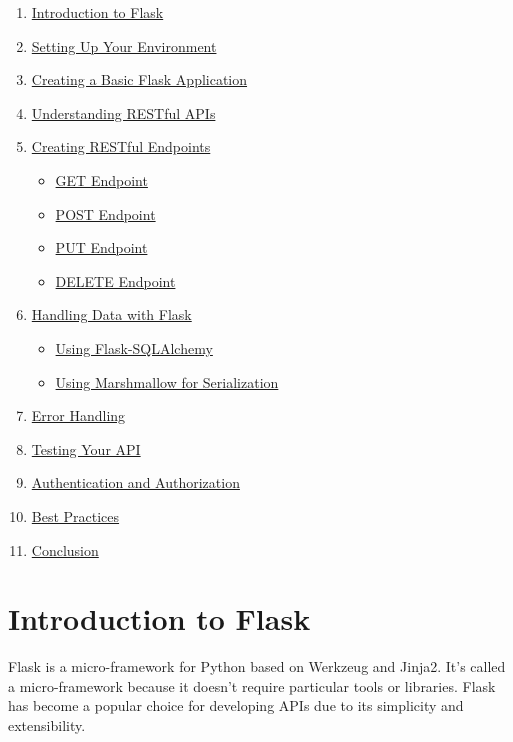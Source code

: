 \documentclass[
  letterpaper,
  DIV=11,
  numbers=noendperiod]{scrreprt}
\providecommand{\tightlist}{%
  \setlength{\itemsep}{0pt}\setlength{\parskip}{0pt}}\usepackage{longtable,booktabs,array}
\begin{document}
\begin{enumerate}
\def\labelenumi{\arabic{enumi}.}
\tightlist
\item
  \hyperref[introduction-to-flask]{Introduction to Flask}
\item
  \hyperref[setting-up-your-environment]{Setting Up Your Environment}
\item
  \hyperref[creating-a-basic-flask-application]{Creating a Basic Flask
  Application}
\item
  \hyperref[understanding-restful-apis]{Understanding RESTful APIs}
\item
  \hyperref[creating-restful-endpoints]{Creating RESTful Endpoints}

  \begin{itemize}
  \tightlist
  \item
    \hyperref[get-endpoint]{GET Endpoint}
  \item
    \hyperref[post-endpoint]{POST Endpoint}
  \item
    \hyperref[put-endpoint]{PUT Endpoint}
  \item
    \hyperref[delete-endpoint]{DELETE Endpoint}
  \end{itemize}
\item
  \hyperref[handling-data-with-flask]{Handling Data with Flask}

  \begin{itemize}
  \tightlist
  \item
    \hyperref[using-flask-sqlalchemy]{Using Flask-SQLAlchemy}
  \item
    \hyperref[using-marshmallow-for-serialization]{Using Marshmallow for
    Serialization}
  \end{itemize}
\item
  \hyperref[error-handling]{Error Handling}
\item
  \hyperref[testing-your-api]{Testing Your API}
\item
  \hyperref[authentication-and-authorization]{Authentication and
  Authorization}
\item
  \hyperref[best-practices]{Best Practices}
\item
  \hyperref[conclusion]{Conclusion}
\end{enumerate}

\section{Introduction to Flask}\label{introduction-to-flask}

Flask is a micro-framework for Python based on Werkzeug and Jinja2. It's
called a micro-framework because it doesn't require particular tools or
libraries. Flask has become a popular choice for developing APIs due to
its simplicity and extensibility.
\end{document}
